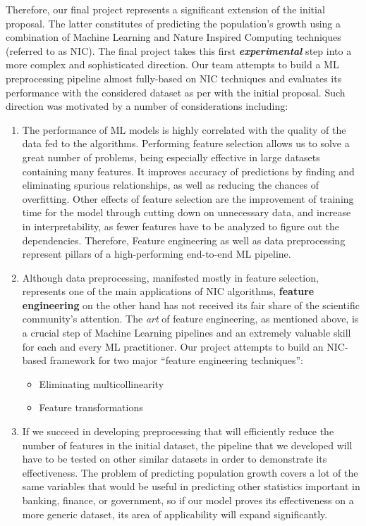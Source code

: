\documentclass[conference]{IEEEtran}
\begin{document}
Therefore, our final project represents a significant extension of the initial proposal. The latter constitutes of predicting the population’s growth using a combination of Machine Learning and Nature Inspired Computing techniques (referred to as NIC). The final project takes this first \emph{\textbf{experimental}} step into a more complex and sophisticated direction. Our team attempts to build a ML preprocessing pipeline almost fully-based on NIC techniques and evaluates its performance with the considered dataset as per with the initial proposal. Such direction was motivated by a number of considerations including:
\begin{enumerate}
	\item The performance of ML models is highly correlated with the quality of the data fed to the algorithms. Performing feature selection allows us to solve a great number of problems, being especially effective in large datasets containing many features. It improves accuracy of predictions by finding and eliminating spurious relationships, as well as reducing the chances of overfitting. Other effects of feature selection are the improvement of training time for the model through cutting down on unnecessary data, and increase in interpretability, as fewer features have to be analyzed to figure out the dependencies. Therefore, Feature engineering as well as data preprocessing represent pillars of a high-performing end-to-end ML pipeline.
	\item Although data preprocessing, manifested mostly in feature selection, represents one of the main applications of NIC algorithms, \textbf{feature engineering} on the other hand has not received its fair share of the scientific community’s attention. The \emph{art} of feature engineering, as mentioned above, is a crucial step of Machine Learning pipelines and an extremely valuable skill for each and every ML practitioner. Our project attempts to build an NIC-based framework for two major “feature engineering techniques”:
	\begin{itemize}
		\item Eliminating multicollinearity
		\item Feature transformations
	\end{itemize}
	\item If we succeed in developing preprocessing that will efficiently reduce the number of features in the initial dataset, the pipeline that we developed will have to be tested on other similar datasets in order to demonstrate its effectiveness. The problem of predicting population growth covers a lot of the same variables that would be useful in predicting other statistics important in banking, finance, or government, so if our model proves its effectiveness on a more generic dataset, its area of applicability will expand significantly.\\
	
\end{enumerate}
\end{document}
